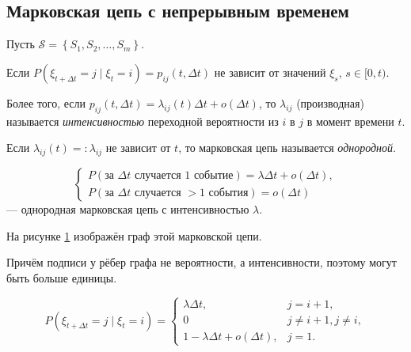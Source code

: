 \subsection{Марковская цепь с непрерывным временем}
Пусть $\mathscr{S} = \left\{ S_1, S_2, \dots, S_m \right\}$.

\begin{definition}
  Если $P(\xi_{t+\Delta t} = j \mid \xi_t = i) = p_{ij}(t, \Delta t)$ не зависит от значений $\xi_s$, 
  $s \in [0, t)$.

  Более того, если $p_{ij}(t, \Delta t) = \lambda_{ij}(t) \Delta t + o(\Delta t)$, 
  то $\lambda_{ij} $ (производная) называется \emph{интенсивностью} переходной вероятности
  из $i$ в $j$ в момент времени $t$.

  Если $\lambda_{ij} (t) =: \lambda_{ij}$ не зависит от $t$, то марковская цепь называется \emph{однородной}.
\end{definition}

\begin{ex}
  \[
    \begin{cases}
      P(\text{за $\Delta t$ случается 1 событие}) = \lambda \Delta t + o(\Delta t), \\
      P(\text{за $\Delta t$ случается $>1$ события}) = o(\Delta t)
    \end{cases}
  \]
  --- однородная марковская цепь с интенсивностью $\lambda$.


  На рисунке \ref{fig:ex731} изображён граф этой марковской цепи.
  \begin{figure}[h!]
    \centering
    \label{fig:ex731}
  \end{figure}

  Причём подписи у рёбер графа не вероятности, а интенсивности, поэтому могут
  быть больше единицы.

  \[
    P(\xi_{t+\Delta t} = j \mid \xi_t = i) = \begin{cases}
      \lambda \Delta t, & j = i+1, \\
      0 & j \neq i+1, j \neq i, \\
      1-\lambda \Delta t + o(\Delta t), & j =1.
    \end{cases}
  \]
\end{ex}

